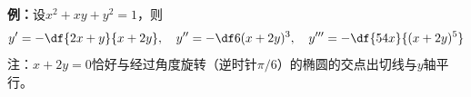 \begin{center}
\end{center}


{\bf 例：}设$x^2+xy+y^2=1$，则
$$y'=-\df{2x+y}{x+2y},\quad y''=-\df6{(x+2y)^3},\quad
y'''=-\df{54x}{(x+2y)^5}$$
注：$x+2y=0$恰好与经过角度旋转（逆时针$\pi/6$）的椭圆的交点出切线与$y$轴平行。

